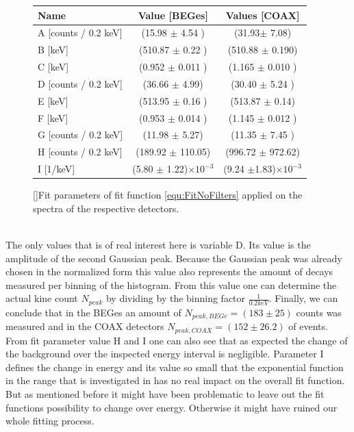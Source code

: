 \documentclass[encoding=utf8,british]{tumphthesis}
\begin{document}
\begin{figure}[t!]
\centering
\begin{tabular}{|l|c|c|}
\hline
Name	& Value [BEGes] & Values [COAX]\\ 
\hline
A [counts / 0.2 keV] &	(15.98 \(\pm\)	4.54	)&	(31.93\(\pm\)	7.08)	\\	
\hline
B [keV] &	(510.87 \(\pm\)	0.22	)&	(510.88 \(\pm\)	0.190)\\	
\hline
C [keV] &	(0.952 \(\pm\)	0.011	)	&	(1.165 \(\pm\)	0.010	)	\\
\hline
D [counts / 0.2 keV] &	(36.66 \(\pm\)	4.99)	&	(30.40 \(\pm\)	5.24	)	\\
\hline
E [keV] &	(513.95 \(\pm\)	0.16	)	&	(513.87 \(\pm\)	0.14)	\\
\hline
F [keV] &	(0.953 \(\pm\)	0.014	)	&	(1.145 \(\pm\)	0.012	)	\\
\hline
G [counts / 0.2 keV] &	(11.98 \(\pm\)	5.27)	&	(11.35 \(\pm\)	7.45	)	\\
\hline
H [counts / 0.2 keV] &	(189.92 \(\pm\)	110.05)	&	(996.72 \(\pm\)	972.62)	\\
\hline
I [1/keV] &	(5.80 \(\pm\) 1.22)$\times10^{-3}$	&	(9.24 \(\pm\)1.83)$\times10^{-3}$ \\
\hline

\end{tabular}
\label{tab:FitParNoFilter}
[]{Fit parameters of fit function \ref{equ:FitNoFilters} applied on the spectra of the respective detectors.}
\end{figure}
\\



The only values that is of real interest here is variable D.
Its value is the amplitude of the second Gaussian peak.
Because the Gaussian peak was already chosen in the normalized form this value also represents the amount of \Kr decays measured per binning of the histogram.
From this value one can determine the actual kine count $N_{peak}$ by dividing by the binning factor $\frac{1}{0.2 \unit{keV}}$.
Finally, we can conclude that in the BEGes an amount of $N_{peak,BEGe} = (183\pm25)$ counts was measured and in the COAX detectors  $N_{peak,COAX} = (152\pm26.2)
$ of events.
\\


From fit parameter value H and I one can also see that as expected the change of the background over the inspected energy interval is negligible.
Parameter I defines the change in energy and its value so small that the exponential function in the range that is investigated in has no real impact on the overall fit function.
But as mentioned before it might have been problematic to leave out the fit functions possibility to change over energy.
Otherwise it might have ruined our whole fitting process. 
\\
\end{document}
